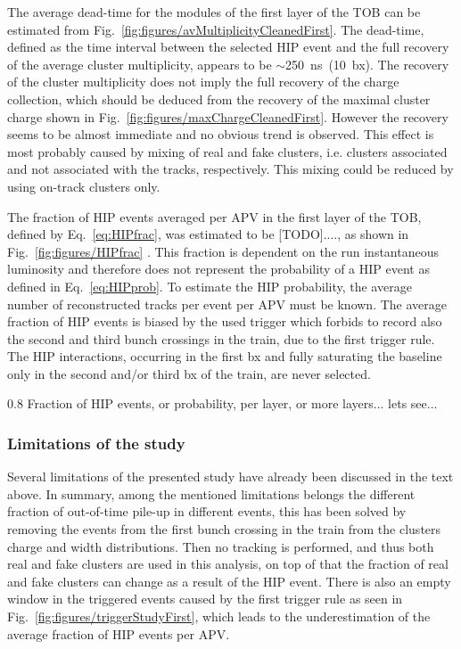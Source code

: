 The average dead-time for the modules of the first layer of the TOB can be estimated from Fig.~\ref{fig:figures/avMultiplicityCleanedFirst}. The dead-time, defined as the time interval between the selected HIP event and the full recovery of the average cluster multiplicity, appears to be $\sim$250~ns~(10~bx). The recovery of the cluster multiplicity does not imply the full recovery of the charge collection, which should be deduced from the recovery of the maximal cluster charge shown in Fig.~\ref{fig:figures/maxChargeCleanedFirst}. However the recovery seems to be almost immediate and no obvious trend is observed. This effect is most probably caused by mixing of real and fake clusters, i.e. clusters associated and not associated with the tracks, respectively. This mixing could be reduced by using on-track clusters only.

The fraction of HIP events averaged per APV in the first layer of the TOB, defined by Eq.~\ref{eq:HIPfrac}, was estimated to be [TODO]...., as shown in Fig.~\ref{fig:figures/HIPfrac} . This fraction is dependent on the run instantaneous luminosity and therefore does not represent the probability of a HIP event as defined in Eq.~\ref{eq:HIPprob}. To estimate the HIP probability, the average number of reconstructed tracks per event per APV must be known. The average fraction of HIP events is biased by the used trigger which forbids to record also the second and third bunch crossings in the train, due to the first trigger rule. The HIP interactions, occurring in the first bx and fully saturating the baseline only in the second and/or third bx of the train, are never selected.
 
                 {0.8}       %
                 {Fraction of HIP events, or probability, per layer, or more layers... lets see... } %

\subsubsection{Limitations of the study~\label{sec:limitationsSelection}}

Several limitations of the presented study have already been discussed in the text above. In summary, among the mentioned limitations belongs the different fraction of out-of-time pile-up in different events, this has been solved by removing the events from the first bunch crossing in the train from the clusters charge and width distributions. Then no tracking is performed, and thus both real and fake clusters are used in this analysis, on top of that the fraction of real and fake clusters can change as a result of the HIP event. There is also an empty window in the triggered events caused by the first trigger rule as seen in Fig.~\ref{fig:figures/triggerStudyFirst}, which leads to the underestimation of the average fraction of HIP events per APV.

